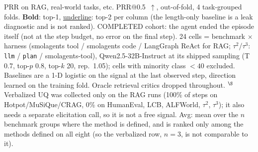\documentclass[10pt, aspectratio=43]{beamer}
\begin{document}
\begin{frame}{PRR on RAG, real-world tasks, etc.}
\vspace{0.25em}
\fontsize{6}{7}\selectfont
PRR@0.5~$\uparrow$, out-of-fold, 4 task-grouped folds. \textbf{Bold}: top-1, \underline{underline}: top-2 per
column (the length-only baseline is a leak diagnostic and is not ranked). COMPLETED cohort: the agent ended the
episode itself (not at the step budget, no error on the final step). 24 cells = benchmark $\times$ harness
(smolagents tool / smolagents code / LangGraph ReAct for RAG; $\tau^2$/$\tau^3$: \texttt{llm} / \texttt{plan} /
smolagents-tool), Qwen2.5-32B-Instruct at its shipped sampling (T 0.7, top-$p$ 0.8, top-$k$ 20, rep.\ 1.05);
cells with minority class $<40$ excluded. Baselines are a 1-D logistic on the signal at the last observed step,
direction learned on the training fold. Oracle retrieval critics dropped throughout.
$^\S$Verbalized UQ was collected only on the RAG runs (100\% of steps on Hotpot/MuSiQue/CRAG, 0\% on
HumanEval, LCB, ALFWorld, $\tau^2$, $\tau^3$); it also needs a separate elicitation call, so it is not a free
signal. Avg: mean over the $n$ benchmark groups where the method is defined, and is ranked only among
the methods defined on all eight (so the verbalized row, $n=3$, is not comparable to it).
\end{frame}
\end{document}
